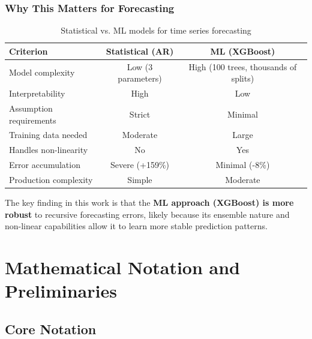 \documentclass[12pt,a4paper]{article}
\begin{document}
\subsubsection{Why This Matters for Forecasting}

\begin{table}[H]
\centering
\small
\begin{tabular}{lcc}
\toprule
\textbf{Criterion} & \textbf{Statistical (AR)} & \textbf{ML (XGBoost)} \\
\midrule
Model complexity & Low (3 parameters) & High (100 trees, thousands of splits) \\
Interpretability & High & Low \\
Assumption requirements & Strict & Minimal \\
Training data needed & Moderate & Large \\
Handles non-linearity & No & Yes \\
Error accumulation & Severe (+159\%) & Minimal (-8\%) \\
Production complexity & Simple & Moderate \\
\bottomrule
\end{tabular}
\caption{Statistical vs. ML models for time series forecasting}
\end{table}

The key finding in this work is that the \textbf{ML approach (XGBoost) is more robust} to recursive forecasting errors, likely because its ensemble nature and non-linear capabilities allow it to learn more stable prediction patterns.

\section{Mathematical Notation and Preliminaries}

\subsection{Core Notation}
\end{document}
